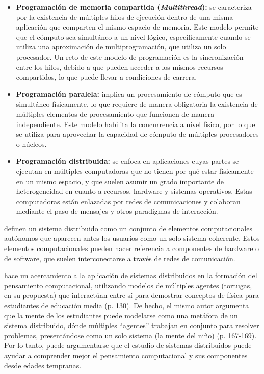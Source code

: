 \begin{itemize}
    \item \textbf{Programación de memoria compartida (\emph{Multithread}):} se caracteriza por la existencia de múltiples hilos de ejecución dentro de una misma aplicación que comparten el mismo espacio de memoria. Este modelo permite que el cómputo sea simultáneo a un nivel lógico, específicamente cuando se utiliza una aproximación de multiprogramación, que utiliza un solo procesador. Un reto de este modelo de programación es la sincronización entre los hilos, debido a que pueden acceder a los mismos recursos compartidos, lo que puede llevar a condiciones de carrera.
    \item \textbf{Programación paralela:} implica un procesamiento de cómputo que es simultáneo físicamente, lo que requiere de manera obligatoria la existencia de múltiples elementos de procesamiento que funcionen de manera independiente. Este modelo habilita la concurrencia a nivel físico, por lo que se utiliza para aprovechar la capacidad de cómputo de múltiples procesadores o núcleos.
    \item \textbf{Programación distribuida:} se enfoca en aplicaciones cuyas partes se ejecutan en múltiples computadoras que no tienen por qué estar físicamente en un mismo espacio, y que suelen asumir un grado importante de heterogeneidad en cuanto a recursos, hardware y sistemas operativos. Estas computadoras están enlazadas por redes de comunicaciones y colaboran mediante el paso de mensajes y otros paradigmas de interacción.
\end{itemize}


 definen un sistema distribuido como un conjunto de elementos computacionales autónomos que aparecen antes los usuarios como un solo sistema coherente. Estos elementos computacionales pueden hacer referencia a componentes de hardware o de software, que suelen interconectarse a través de redes de comunicación.

 hace un acercamiento a la aplicación de sistemas distribuidos en la formación del pensamiento computacional, utilizando modelos de múltiples agentes (tortugas, en su propuesta) que interactúan entre sí para demostrar conceptos de física para estudiantes de educación media (p. 130). De hecho, el mismo autor argumenta que la mente de los estudiantes puede modelarse como una metáfora de un sistema distribuido, dónde múltiples “agentes” trabajan en conjunto para resolver problemas, presentándose como un solo sistema (la mente del niño) (p. 167-169). Por lo tanto, puede argumentarse que el estudio de sistemas distribuidos puede ayudar a comprender mejor el pensamiento computacional y sus componentes desde edades tempranas.

